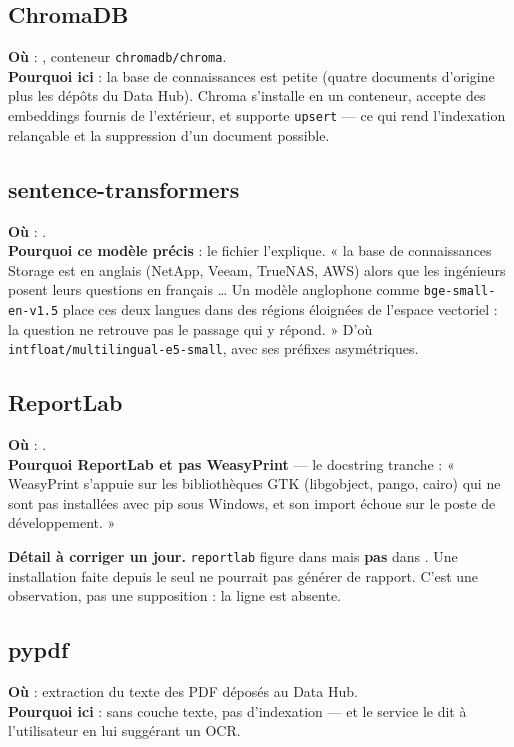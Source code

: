 \subsection{ChromaDB}
\textbf{Où} : , conteneur \texttt{chromadb/chroma}.\\
\textbf{Pourquoi ici} : la base de connaissances est petite (quatre documents
d'origine plus les dépôts du Data Hub). Chroma s'installe en un conteneur,
accepte des embeddings fournis de l'extérieur, et supporte \texttt{upsert} ---
ce qui rend l'indexation relançable et la suppression d'un document possible.

\subsection{sentence-transformers}
\textbf{Où} : .\\
\textbf{Pourquoi ce modèle précis} : le fichier l'explique. « la base de
connaissances Storage est en anglais (NetApp, Veeam, TrueNAS, AWS) alors que les
ingénieurs posent leurs questions en français \ldots{} Un modèle anglophone comme
\texttt{bge-small-en-v1.5} place ces deux langues dans des régions éloignées de
l'espace vectoriel : la question ne retrouve pas le passage qui y répond. »
D'où \texttt{intfloat/multilingual-e5-small}, avec ses préfixes asymétriques.

\subsection{ReportLab}
\textbf{Où} : .\\
\textbf{Pourquoi ReportLab et pas WeasyPrint} --- le docstring tranche :
« WeasyPrint s'appuie sur les bibliothèques GTK (libgobject, pango, cairo) qui
ne sont pas installées avec pip sous Windows, et son import échoue sur le poste
de développement. »

\begin{warnbox}
\textbf{Détail à corriger un jour.} \texttt{reportlab} figure dans
 mais \textbf{pas} dans .
Une installation faite depuis le seul  ne pourrait pas
générer de rapport. C'est une observation, pas une supposition : la ligne est
absente.
\end{warnbox}

\subsection{pypdf}
\textbf{Où} : extraction du texte des PDF déposés au Data Hub.\\
\textbf{Pourquoi ici} : sans couche texte, pas d'indexation --- et le service le
dit à l'utilisateur en lui suggérant un OCR.

